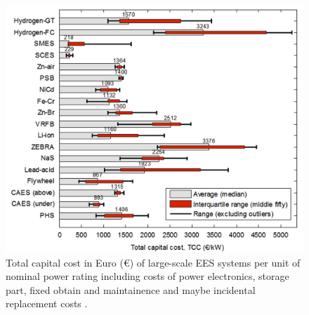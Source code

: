\begin{figure}[htbp]  
\centering
\includegraphics[width=0.75\linewidth]{FIG/TCC_EES}
\caption[Total capital cost in Euro (€) of large-scale EES systems per unit of nominal power rating including costs of power electronics, storage part, fixed obtain and maintainence and maybe incidental replacement costs.]{Total capital cost in Euro (€) of large-scale EES systems per unit of nominal power rating including costs of power electronics, storage part, fixed obtain and maintainence and maybe incidental replacement costs \cite{Zakeri2015}.}\label{TCC_EES}
\end{figure}